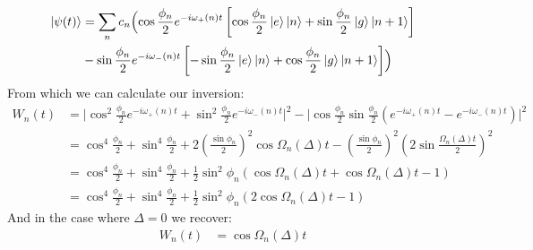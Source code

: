 \begin{align*}
	\ket{\psi(t)} &= \sum_n c_n \Bigl(\cos\frac{\phi_n}{2}e^{-i\omega_+(n) t}\left[\cos\frac{\phi_n}{2} \ket{e}\ket{n} + \sin\frac{\phi_n}{2} \ket{g}\ket{n+1} \right] \\
		& - \sin\frac{\phi_n}{2}e^{-i\omega_-(n) t}\left[-\sin\frac{\phi_n}{2} \ket{e}\ket{n} + \cos\frac{\phi_n}{2} \ket{g}\ket{n+1} \right]\Bigr)
\end{align*}
From which we can calculate our inversion:
\begin{align*}
	W_n(t) &= \Big|\cos^2\frac{\phi_n}{2} e^{-i\omega_+(n) t} + \sin^2\frac{\phi_n}{2} e^{-i\omega_-(n) t}\Big|^2 - \Big|\cos\frac{\phi_n}{2}\sin\frac{\phi_n}{2}\left(e^{-i\omega_+(n)t} - e^{-i\omega_-(n)t}\right)\Big|^2 \\
	&= \cos^4\frac{\phi_n}{2} + \sin^4\frac{\phi_n}{2} + 2\left(\frac{\sin\phi_n}{2}\right)^2\cos\Omega_n(\Delta) t - \left(\frac{\sin\phi_n}{2}\right)^2\left(2\sin\frac{\Omega_n(\Delta) t}{2}\right)^2 \\
	&= \cos^4\frac{\phi_n}{2} + \sin^4\frac{\phi_n}{2} + \frac{1}{2}\sin^2\phi_n\left(\cos\Omega_n(\Delta) t +\cos\Omega_n(\Delta) t - 1\right) \\
	&= \cos^4\frac{\phi_n}{2} + \sin^4\frac{\phi_n}{2} + \frac{1}{2}\sin^2\phi_n\left(2\cos\Omega_n(\Delta) t  - 1\right)
\end{align*}
And in the case where $\Delta=0$ we recover:
\begin{align*}
	W_n(t) &= \cos\Omega_n(\Delta) t
\end{align*}

